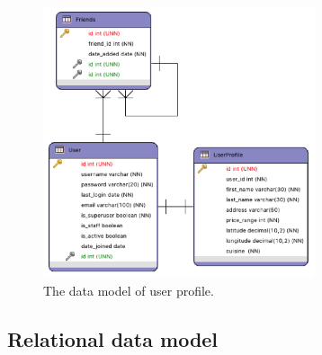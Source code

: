 \begin{figure}
\captionsetup{font=footnotesize}
\centering
\includegraphics[width=8cm,height=8cm,keepaspectratio]
{img/data-usermodel.png}
\caption{The data model of user profile.}
\label{fig:datausermodel}     
\end{figure}

\subsection{Relational data model} 

